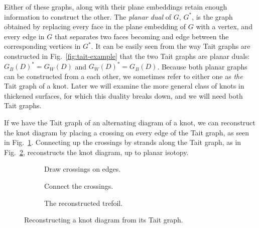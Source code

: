 \documentclass[12pt]{report}
\begin{document}
Either of these graphs, along with their plane embeddings retain enough information to construct the other. The \textit{planar dual} of $G$, $G^{*}$, is the graph obtained by replacing every face in the plane embedding of $G$ with a vertex, and every edge in $G$ that separates two faces becoming and edge between the corresponding vertices in $G^{*}$. It can be easily seen from the way Tait graphs are constructed in Fig.~\ref{fig:tait-example} that the two Tait graphs are planar duals: $G_{B}(D)^{*} = G_{W}(D)$ and $G_{W}(D)^{*} = G_{B}(D)$. Because both planar graphs can be constructed from a each other, we sometimes refer to either one as \textit{the} Tait graph of a knot. Later we will examine the more general class of knots in thickened surfaces, for which this duality breaks down, and we will need both Tait graphs.

If we have the Tait graph of an alternating diagram of a knot, we can reconstruct the knot diagram by placing a crossing on every edge of the Tait graph, as seen in Fig.~\ref{fig:trefoil-tait-with-crossings}. Connecting up the crossings by strands along the Tait graph, as in Fig.~\ref{fig:trefoil-resconstructed},	 reconstructs the knot diagram, up to planar isotopy.

\begin{figure}[h]
	\centering
	\hspace*{\fill}
	\begin{subfigure}[b]{0.3 \textwidth}
		\centering
		\def\svgscale{0.22}
		
		\caption{Draw crossings on edges.}
		\label{fig:trefoil-tait-with-crossings}
	\end{subfigure}
	\hspace*{\fill}
	\begin{subfigure}[b]{0.3 \textwidth}
		\centering
		\def\svgscale{0.22}
		
		\caption{Connect the crossings.}
		\label{fig:trefoil-resconstructed}
	\end{subfigure}
	\hspace*{\fill}
	\begin{subfigure}[b]{0.3 \textwidth}
		\centering
		\def\svgscale{0.2}
		
		\caption{The reconstructed trefoil.}
		\label{fig:trefoil-resconstructed-isotopy}
	\end{subfigure}
	\hspace*{\fill}
	\caption{Reconstructing a knot diagram from its Tait graph.}
	\label{fig:tait-reconstruction-example}
\end{figure}
\end{document}
